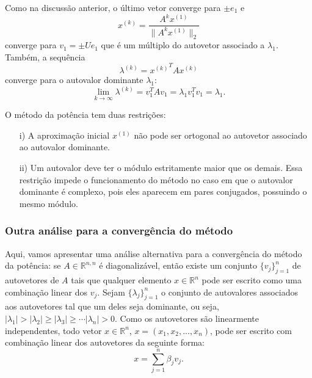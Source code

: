 Como na discussão anterior, o último vetor converge para $\pm e_1$ e
\begin{equation*}
  x^{(k)} = \frac{A^kx^{(1)}}{\|A^kx^{(1)}\|_2}
\end{equation*}
converge para $v_1=\pm Ue_1$ que é um múltiplo do autovetor associado a $\lambda_1$. Também, a sequência
\begin{equation*}
  \lambda^{(k)} = {x^{(k)}}^TAx^{(k)}
\end{equation*}
converge para o autovalor dominante $\lambda_1$:
\begin{equation*}
  \lim_{k\to\infty}\lambda^{(k)} =  v_1^TA v_1 = \lambda_1v_1^Tv_1=\lambda_1.
\end{equation*}

\begin{obs}
O método da potência tem duas restrições:
\begin{itemize}
 \item[i)] A aproximação inicial $x^{(1)}$ não pode ser ortogonal ao autovetor associado ao autovalor dominante.
 \item[ii)] Um autovalor deve ter o módulo estritamente maior que os demais. Essa restrição impede o funcionamento do método no caso em que o autovalor dominante é complexo, pois eles aparecem em pares conjugados, possuindo o mesmo módulo.
\end{itemize}
\end{obs}

\subsubsection{Outra análise para a convergência do método}

Aqui, vamos apresentar uma análise alternativa para a convergência do método da potência: se $A\in \mathbb{R}^{n,n}$ é diagonalizável, então existe um conjunto $\{v_{j}\}_{j=1}^n$ de autovetores de $A$ tais que qualquer elemento $x\in\mathbb{R}^n$ pode ser escrito como uma combinação linear dos $v_{j}$. Sejam $\{\lambda_j\}_{j=1}^n$ o conjunto de autovalores associados aos autovetores tal que um deles seja dominante, ou seja, $|\lambda_1|>|\lambda_2|\geq |\lambda_3|\geq\cdots |\lambda_n|>0$. Como os autovetores são linearmente independentes, todo vetor $x\in\mathbb{R}^n$, $x=(x_1,x_2,...,x_n)$, pode ser escrito com combinação linear dos autovetores da seguinte forma:
\begin{equation}\label{eq:met_pot_forma}
x = \sum_{j=1}^n \beta_jv_{j}.
\end{equation}

